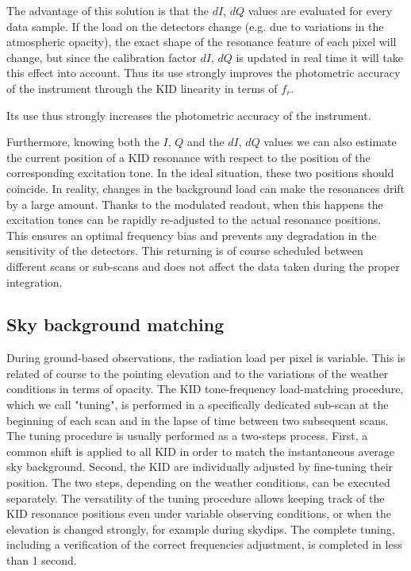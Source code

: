 \documentclass[]{aa} %
\begin{document}
The advantage of this solution is that the $dI$, $dQ$ values are evaluated for every data sample. If the load on the detectors change (e.g. due to variations in the atmospheric opacity), the exact shape of the resonance feature of each pixel will change, but since the calibration factor $dI$, $dQ$ is updated in real time it will take this effect into account. Thus its use strongly improves the photometric accuracy of the instrument through the KID linearity in terms of $f_r$.

Its use thus strongly increases the photometric accuracy of the instrument.

Furthermore, knowing both the $I$, $Q$ and the $dI$, $dQ$ values we can also estimate the current position of a KID resonance with respect to the position of the corresponding excitation tone. In the ideal situation, these two positions should coincide. In reality, changes in the background load can make the resonances drift by a large amount. Thanks to the modulated readout, when this happens the excitation tones can be rapidly re-adjusted to the actual resonance positions. This ensures an optimal frequency bias and prevents any degradation in the sensitivity of the detectors. This returning is of course scheduled between different scans or sub-scans and does not affect the data taken during the proper integration.

\subsection{Sky background matching}
\label{Sky background matching}

During ground-based observations, the radiation load per pixel is variable. This is related of course to the pointing elevation and to the variations of the weather conditions in terms of opacity. The KID tone-frequency load-matching procedure, which we call "tuning", is performed in a specifically dedicated sub-scan at the beginning of each scan and in the lapse of time between two subsequent scans. The tuning procedure is usually performed as a two-steps process. First, a common shift is applied to all KID in order to match the instantaneous average sky background. Second, the KID are individually adjusted by fine-tuning their position. The two steps, depending on the weather conditions, can be executed separately. The versatility of the tuning procedure allows keeping track of the KID resonance positions even under variable observing conditions, or when the elevation is changed strongly, for example during skydips. The complete tuning, including a verification of the correct frequencies adjustment, is completed in less than 1 second. 
\end{document}
